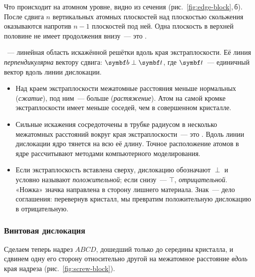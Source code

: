 Что происходит на атомном уровне, видно из сечения
(рис.~\ref{fig:edge-block},\,б). После сдвига $n$ вертикальных атомных
плоскостей над плоскостью скольжения оказываются напротив $n-1$
плоскостей под ней. Одна плоскость в верхней половине не имеет
продолжения внизу~— это .

\begin{opredelenie}
~— линейная область искажённой решётки вдоль
края экстраплоскости. Её линия \emph{перпендикулярна} вектору сдвига:
$\vb b\perp\vb t$, где $\vb t$~— единичный вектор вдоль линии дислокации.
\end{opredelenie}

\begin{itemize}
\item Над краем экстраплоскости межатомные расстояния меньше нормальных
(\emph{сжатие}), под ним~— больше (\emph{растяжение}). Атом на самой кромке
экстраплоскости имеет меньше соседей, чем в совершенном кристалле.
\item Сильные искажения сосредоточены в трубке радиусом в несколько
межатомных расстояний вокруг края экстраплоскости~— это . Вдоль линии дислокации ядро тянется на всю её длину.
Точное расположение атомов в ядре рассчитывают методами компьютерного
моделирования.
\item Если экстраплоскость вставлена сверху, дислокацию обозначают
$\perp$ и условно называют \emph{положительной}; если снизу~— $\top$,
\emph{отрицательной}. «Ножка» значка направлена в сторону лишнего
материала. Знак~— дело соглашения: перевернув кристалл, мы превратим
положительную дислокацию в отрицательную.
\end{itemize}

\subsubsection{Винтовая дислокация}

Сделаем теперь надрез $ABCD$, дошедший только до середины кристалла, и
сдвинем одну его сторону относительно другой на межатомное расстояние
\emph{вдоль} края надреза (рис.~\ref{fig:screw-block}).

